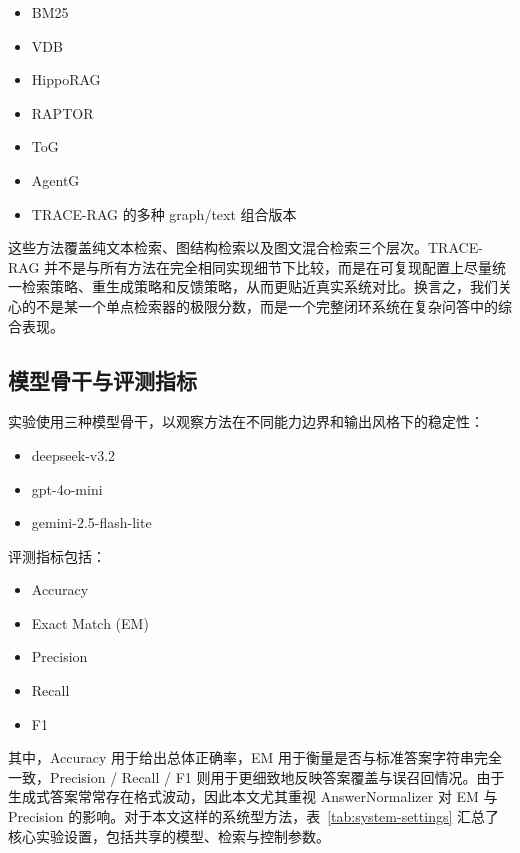 ﻿\documentclass[UTF8,11pt,twocolumn]{ctexart}
\begin{document}
\begin{itemize}[leftmargin=1.5em]
  \item BM25
  \item VDB
  \item HippoRAG
  \item RAPTOR
  \item ToG
  \item AgentG
  \item TRACE-RAG 的多种 graph/text 组合版本
\end{itemize}

这些方法覆盖纯文本检索、图结构检索以及图文混合检索三个层次。TRACE-RAG 并不是与所有方法在完全相同实现细节下比较，而是在可复现配置上尽量统一检索策略、重生成策略和反馈策略，从而更贴近真实系统对比。换言之，我们关心的不是某一个单点检索器的极限分数，而是一个完整闭环系统在复杂问答中的综合表现。

\subsection{模型骨干与评测指标}

实验使用三种模型骨干，以观察方法在不同能力边界和输出风格下的稳定性：

\begin{itemize}[leftmargin=1.5em]
  \item deepseek-v3.2
  \item gpt-4o-mini
  \item gemini-2.5-flash-lite
\end{itemize}

评测指标包括：

\begin{itemize}[leftmargin=1.5em]
  \item Accuracy
  \item Exact Match (EM)
  \item Precision
  \item Recall
  \item F1
\end{itemize}

其中，Accuracy 用于给出总体正确率，EM 用于衡量是否与标准答案字符串完全一致，Precision / Recall / F1 则用于更细致地反映答案覆盖与误召回情况。由于生成式答案常常存在格式波动，因此本文尤其重视 AnswerNormalizer 对 EM 与 Precision 的影响。对于本文这样的系统型方法，表~\ref{tab:system-settings} 汇总了核心实验设置，包括共享的模型、检索与控制参数。
\end{document}
